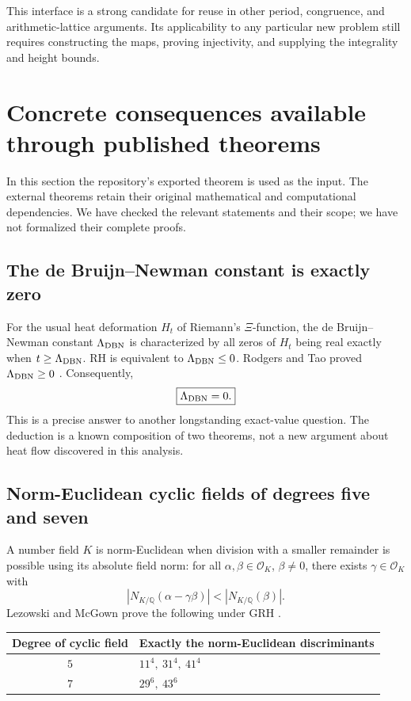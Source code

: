 \documentclass[11pt,letterpaper]{article}
\theoremstyle{definition}
\theoremstyle{remark}
\newcommand{\Q}{\mathbb Q}
\begin{document}
This interface is a strong candidate for reuse in other period, congruence,
and arithmetic-lattice arguments. Its applicability to any particular
new problem still requires constructing the maps, proving injectivity,
and supplying the integrality and height bounds.

\section{Concrete consequences available through published theorems}
\label{sec:consequences}

In this section the repository's exported theorem is used as the input.
The external theorems retain their original mathematical and computational
dependencies. We have checked the relevant statements and their scope;
we have not formalized their complete proofs.

\subsection{The de Bruijn--Newman constant is exactly zero}

For the usual heat deformation \(H_t\) of Riemann's \(\Xi\)-function,
the de Bruijn--Newman constant \(\Lambda_{\rm DBN}\) is characterized by
all zeros of \(H_t\) being real exactly when \(t\ge\Lambda_{\rm DBN}\).
RH is equivalent to \(\Lambda_{\rm DBN}\le0\). Rodgers and Tao proved
\(\Lambda_{\rm DBN}\ge0\) \cite{rodgers-tao}. Consequently,
\[
 \boxed{\Lambda_{\rm DBN}=0.}
\]
This is a precise answer to another longstanding exact-value question.
The deduction is a known composition of two theorems, not a new argument
about heat flow discovered in this analysis.

\subsection{Norm-Euclidean cyclic fields of degrees five and seven}

A number field \(K\) is norm-Euclidean when division with a smaller
remainder is possible using its absolute field norm:
for all \(\alpha,\beta\in\mathcal O_K\), \(\beta\ne0\), there exists
\(\gamma\in\mathcal O_K\) with
\[
 |N_{K/\Q}(\alpha-\gamma\beta)|<|N_{K/\Q}(\beta)|.
\]
Lezowski and McGown prove the following under GRH
\cite[Theorems 1.3 and 1.4]{lezowski-mcgown}.

\begin{center}
\begin{tabular}{@{}cl@{}}
\toprule
Degree of cyclic field & Exactly the norm-Euclidean discriminants\\
\midrule
\(5\) & \(11^4,\ 31^4,\ 41^4\)\\
\(7\) & \(29^6,\ 43^6\)\\
\bottomrule
\end{tabular}
\end{center}
\end{document}
